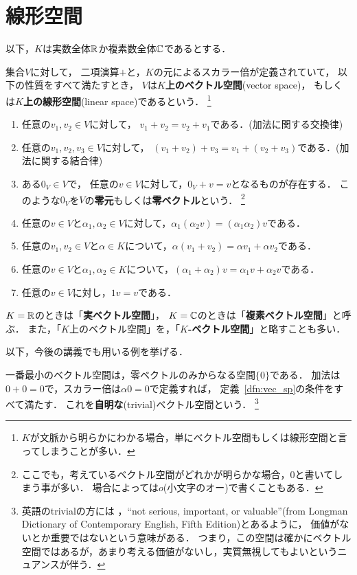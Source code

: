 \section{線形空間}
以下，$K$は実数全体$\mathbb{R}$か複素数全体$\mathbb{C}$であるとする．
\begin{dfn}\label{dfn:vec_sp}
    集合$V$に対して，
    二項演算$+$と，$K$の元によるスカラー倍が定義されていて，
    以下の性質をすべて満たすとき，
    $V$は\textbf{$K$上のベクトル空間}(vector space)，
    もしくは\textbf{$K$上の線形空間}(linear space)であるという．
    \footnote{$K$が文脈から明らかにわかる場合，単にベクトル空間もしくは線形空間と言ってしまうことが多い．}
    \begin{enumerate}
        \item 任意の$v_1,v_2 \in V$に対して，
        $v_1 + v_2 = v_2 + v_1$である．(加法に関する交換律)
        \item 任意の$v_1,v_2,v_3 \in V$に対して，
        $(v_1 + v_2) + v_3 = v_1 + (v_2 + v_3)$である．(加法に関する結合律)
        \item ある$0_V \in V$で，
        任意の$v \in V$に対して，$0_V + v = v$となるものが存在する．
        このような$0_V$を$V$の\textbf{零元}もしくは\textbf{零ベクトル}という．
        \footnote{ここでも，考えているベクトル空間がどれかが明らかな場合，$0$と書いてしまう事が多い．
        場合によっては$o$(小文字のオー)で書くこともある．}
        \item 任意の$v \in V$と$\alpha_1,\alpha_2 \in V$に対して，$\alpha_1(\alpha_2 v) = (\alpha_1 \alpha_2)v$である．
        \item 任意の$v_1,v_2 \in V$と$\alpha \in K$について，$\alpha(v_1 + v_2) = \alpha v_1 + \alpha v_2$である．
        \item 任意の$v \in V$と$\alpha_1,\alpha_2 \in K$について，$(\alpha_1 + \alpha_2)v = \alpha_1 v + \alpha_2 v$である．
        \item 任意の$v \in V$に対し，$1v = v$である．
    \end{enumerate}
\end{dfn}
\begin{notation}
    $K=\mathbb{R}$のときは「\textbf{実ベクトル空間}」，
    $K=\mathbb{C}$のときは「\textbf{複素ベクトル空間}」と呼ぶ．
    また，「$K$上のベクトル空間」を，「\textbf{$K$-ベクトル空間}」と略すことも多い．
\end{notation}
以下，今後の講義でも用いる例を挙げる．
\begin{example}
    一番最小のベクトル空間は，零ベクトルのみからなる空間$\{0\}$である．
    加法は$0+0=0$で，スカラー倍は$\alpha 0 = 0$で定義すれば，
    定義~\ref{dfn:vec_sp}の条件をすべて満たす．
    これを\textbf{自明な}(trivial)ベクトル空間という．
    \footnote{英語のtrivialの方には
    ，``not serious, important, or valuable''(from Longman Dictionary of Contemporary English, Fifth Edition)とあるように，
    価値がないとか重要ではないという意味がある．
    つまり，この空間は確かにベクトル空間ではあるが，あまり考える価値がないし，実質無視してもよいというニュアンスが伴う．}
\end{example}

